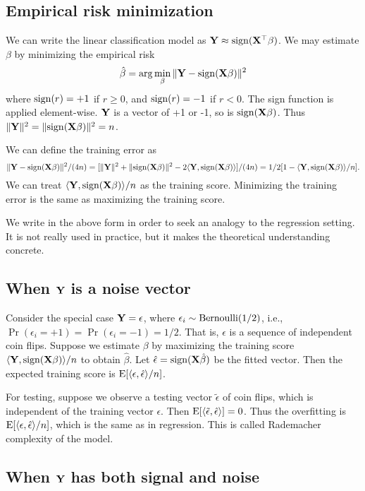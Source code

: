 \documentclass[11pt]{article}
\newcommand{\E}{\mathbb{E}}
\def\T{{\top}}
\def\E{{\rm E}}
\def\T{{\top}}
\def\X{{\bf X}}
\def\Y{{\bf Y}}
\begin{document}
\subsection{Empirical risk minimization}

We can write the linear classification model as $\Y \approx {\rm sign}( \X^{\T}\beta)$. We may estimate $\beta$ by minimizing the empirical risk
\[
\hat{\beta} = \arg\min_{\beta} \|\Y - {\rm sign}( \X\beta)\|^{2} 
\]
where ${\rm sign}(r) = +1$ if $r \geq 0$, and ${\rm sign}(r) = -1$ if $r < 0$. The sign function is applied element-wise. $\Y$ is a vector of +1 or -1, so is ${\rm sign}(\X\beta)$. Thus $\|\Y\|^2  = \|{\rm sign}(\X\beta)\|^2 = n$. 

We can define the training error as 
\[
\|\Y - {\rm sign}(\X\beta)\|^2/(4n) = [\|\Y\|^2 + \|{\rm sign}(\X\beta)\|^2 - 2\langle \Y, {\rm sign}(\X\beta)\rangle]/(4n) = 1/2[1 - \langle \Y, {\rm sign}(\X\beta)\rangle/n]. 
\]
We can treat $ \langle \Y, {\rm sign}(\X\beta)\rangle/n$ as the training score. Minimizing the training error is the same as maximizing the training score. 
 
We write in the above form in order to seek an analogy to the regression setting. It is not really used in practice, but it makes the theoretical understanding concrete. 


\subsection{When $\Y$ is a noise vector} 

Consider the special case $\Y = \epsilon$, where $\epsilon_i \sim {\rm Bernoulli}(1/2)$, i.e., $\Pr(\epsilon_i = +1) = \Pr(\epsilon_i = -1) = 1/2$. That is, $\epsilon$ is a sequence of independent coin flips. Suppose we estimate $\beta$ by maximizing the training score $\langle \Y, {\rm sign}(\X\beta)\rangle/n$ to obtain $\hat{\beta}$. Let $\hat{\epsilon} = {\rm sign}(\X\hat{\beta})$ be the fitted vector. Then the expected training score is $\E[\langle \epsilon, \hat{\epsilon}\rangle/n]$. 

For testing, suppose we observe a testing vector $\tilde{\epsilon}$ of coin flips, which is independent of the training vector $\epsilon$. Then $\E[\langle \tilde{\epsilon}, \hat{\epsilon}\rangle] = 0$. Thus the overfitting is $\E[\langle \epsilon, \hat{\epsilon}\rangle/n]$, which is the same as in regression. This is called Rademacher complexity of the model. 

\subsection{When $\Y$ has both signal and noise} 
\end{document}
